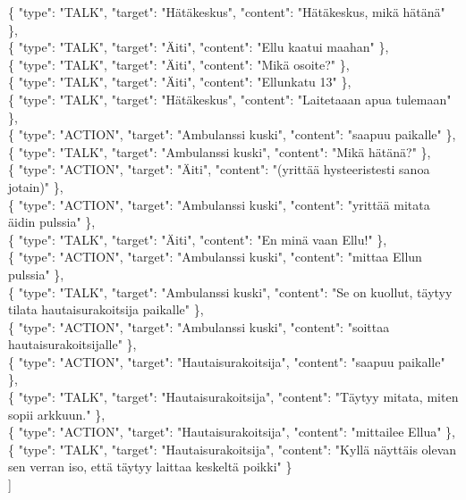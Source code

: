     \{
        "type": "TALK",
        "target": "Hätäkeskus",
        "content": "Hätäkeskus, mikä hätänä"
    \},\\
    \{
        "type": "TALK",
        "target": "Äiti",
        "content": "Ellu kaatui maahan"
    \},\\
    \{
        "type": "TALK",
        "target": "Äiti",
        "content": "Mikä osoite?"
    \},\\
    \{
        "type": "TALK",
        "target": "Äiti",
        "content": "Ellunkatu 13"
    \},\\
    \{
        "type": "TALK",
        "target": "Hätäkeskus",
        "content": "Laitetaaan apua tulemaan"
    \},\\
    \{
        "type": "ACTION",
        "target": "Ambulanssi kuski",
        "content": "saapuu paikalle"
    \},\\
    \{
        "type": "TALK",
        "target": "Ambulanssi kuski",
        "content": "Mikä hätänä?"
    \},\\
    \{
        "type": "ACTION",
        "target": "Äiti",
        "content": "(yrittää hysteeristesti sanoa jotain)"
    \},\\
    \{
        "type": "ACTION",
        "target": "Ambulanssi kuski",
        "content": "yrittää mitata äidin pulssia"
    \},\\
    \{
        "type": "TALK",
        "target": "Äiti",
        "content": "En minä vaan Ellu!"
    \},\\
    \{
        "type": "ACTION",
        "target": "Ambulanssi kuski",
        "content": "mittaa Ellun pulssia"
    \},\\
    \{
        "type": "TALK",
        "target": "Ambulanssi kuski",
        "content": "Se on kuollut, täytyy tilata hautaisurakoitsija paikalle"
    \},\\
    \{
        "type": "ACTION",
        "target": "Ambulanssi kuski",
        "content": "soittaa hautaisurakoitsijalle"
    \},\\
    \{
        "type": "ACTION",
        "target": "Hautaisurakoitsija",
        "content": "saapuu paikalle"
    \},\\
    \{
        "type": "TALK",
        "target": "Hautaisurakoitsija",
        "content": "Täytyy mitata, miten sopii arkkuun."
    \},\\
    \{
        "type": "ACTION",
        "target": "Hautaisurakoitsija",
        "content": "mittailee Ellua"
    \},\\
    \{
        "type": "TALK",
        "target": "Hautaisurakoitsija",
        "content": "Kyllä näyttäis olevan sen verran iso, että täytyy laittaa keskeltä poikki"
    \}\\
]

